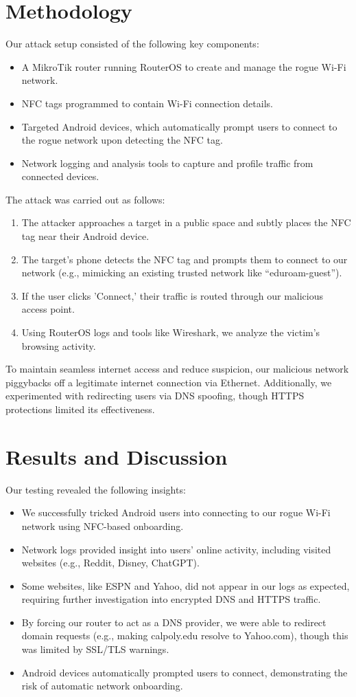 \documentclass[sigconf]{acmart}
\begin{document}
\section{Methodology}
Our attack setup consisted of the following key components:
\begin{itemize}
    \item A MikroTik router running RouterOS to create and manage the rogue Wi-Fi network.
    \item NFC tags programmed to contain Wi-Fi connection details.
    \item Targeted Android devices, which automatically prompt users to connect to the rogue network upon detecting the NFC tag.
    \item Network logging and analysis tools to capture and profile traffic from connected devices.
\end{itemize}

The attack was carried out as follows:
\begin{enumerate}
    \item The attacker approaches a target in a public space and subtly places the NFC tag near their Android device.
    \item The target's phone detects the NFC tag and prompts them to connect to our network (e.g., mimicking an existing trusted network like “eduroam-guest”).
    \item If the user clicks 'Connect,' their traffic is routed through our malicious access point.
    \item Using RouterOS logs and tools like Wireshark, we analyze the victim's browsing activity.
\end{enumerate}

To maintain seamless internet access and reduce suspicion, our malicious network piggybacks off a legitimate internet connection via Ethernet. Additionally, we experimented with redirecting users via DNS spoofing, though HTTPS protections limited its effectiveness.

\section{Results and Discussion}
Our testing revealed the following insights:
\begin{itemize}
    \item We successfully tricked Android users into connecting to our rogue Wi-Fi network using NFC-based onboarding.
    \item Network logs provided insight into users’ online activity, including visited websites (e.g., Reddit, Disney, ChatGPT).
    \item Some websites, like ESPN and Yahoo, did not appear in our logs as expected, requiring further investigation into encrypted DNS and HTTPS traffic.
    \item By forcing our router to act as a DNS provider, we were able to redirect domain requests (e.g., making calpoly.edu resolve to Yahoo.com), though this was limited by SSL/TLS warnings.
    \item Android devices automatically prompted users to connect, demonstrating the risk of automatic network onboarding.
\end{itemize}
\end{document}

